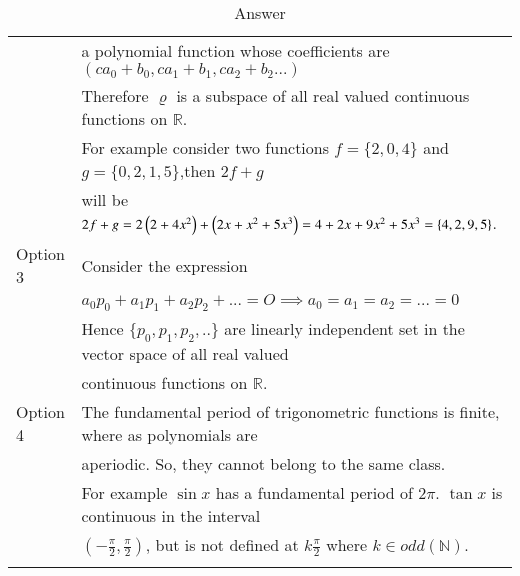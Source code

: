 \begin{longtable}{|l|l|}
    & a polynomial function whose coefficients are $(ca_0+b_0,ca_1+b_1,ca_2+b_2...)$\\
    &Therefore $\varrho$ is a subspace of all real valued continuous functions on $\mathbb{R}$.\\
    & For example consider two functions $f=\{2,0,4\}$ and $g=\{0,2,1,5\}$,then $2f+g$ \\
    & will be $2f+g=2\left(2+4x^2\right)+\left(2x+x^2+5x^3\right)=4+2x+9x^2+5x^3=\{4,2,9,5\}$.\\
    \hline
    Option 3&Consider the expression\\
    &$a_0p_0+a_1p_1+a_2p_2+...=O\implies a_0=a_1=a_2=...=0$\\
    &Hence $\{p_0,p_1,p_2,..\}$ are linearly independent set in the vector space of all real valued \\
    &continuous functions on $\mathbb{R}$.\\
    \hline
    Option 4&The fundamental period of trigonometric functions is finite, where as polynomials are \\
    &aperiodic. So, they cannot belong to the same class.\\
    &For example $\sin{x}$ has a fundamental period of $2\pi$. $\tan{x}$ is continuous in the interval \\
    &$(-\frac{\pi}{2},\frac{\pi}{2})$, but is not defined at $k\frac{\pi}{2}$ where $k\in odd(\mathbb{N})$.\\
    \hline
    \caption{Answer}
    \label{eq:solutions/2015/june/74/tab:Ans}
\end{longtable}
\twocolumn
